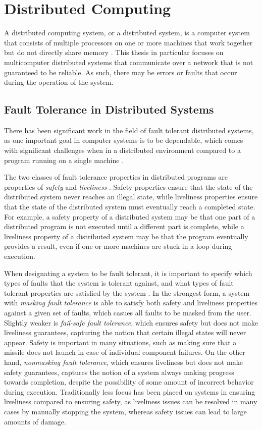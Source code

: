 \documentclass[oneside]{report}
\begin{document}
\section{Distributed Computing}

A distributed computing system, or a distributed system, is a computer system that consists of multiple processors on one or more machines that work together but do not directly share memory \cite{10.1145/72551.72552}.
This thesis in particular focuses on multicomputer distributed systems that communicate over a network that is not guaranteed to be reliable.
As such, there may be errors or faults that occur during the operation of the system.

\subsection{Fault Tolerance in Distributed Systems}
There has been significant work in the field of fault tolerant distributed systems, as one important goal in computer systems is to be dependable, which comes with significant challenges when in a distributed environment compared to a program running on a single machine \cite{10.1145/311531.311532}.

The two classes of fault tolerance properties in distributed programs are properties of \textit{safety} and \textit{liveliness} \cite{1702415}.
Safety properties ensure that the state of the distributed system never reaches an illegal state, while liveliness properties ensure that the state of the distributed system must eventually reach a completed state.
For example, a safety property of a distributed system may be that one part of a distributed program is not executed until a different part is complete, while a liveliness property of a distributed system may be that the program eventually provides a result, even if one or more machines are stuck in a loop during execution.

When designating a system to be fault tolerant, it is important to specify which types of faults that the system is tolerant against, and what types of fault tolerant properties are satisfied by the system \cite{10.1145/311531.311532}.
In the strongest form, a system with \textit{masking fault tolerance} is able to satisfy both safety and liveliness properties against a given set of faults, which casues all faults to be masked from the user.
Slightly weaker is \textit{fail-safe fault tolerance}, which ensures safety but does not make liveliness guarantees, capturing the notion that certain illegal states will never appear.
Safety is important in many situations, such as making sure that a missile does not launch in case of individual component failures.
On the other hand, \textit{nonmasking fault tolerance}, which ensures liveliness but does not make safety guarantees, captures the notion of a system always making progress towards completion, despite the possibility of some amount of incorrect behavior during execution.
Traditionally less focus has been placed on systems in ensuring liveliness compared to ensuring safety, as liveliness issues can be resolved in many cases by manually stopping the system, whereas safety issues can lead to large amounts of damage.
\end{document}
